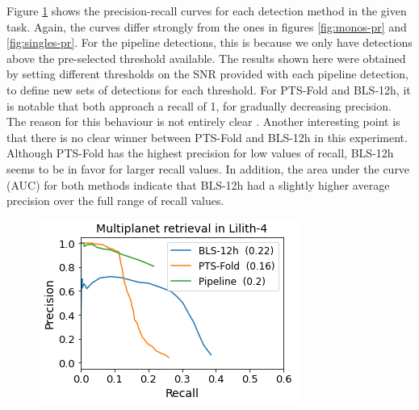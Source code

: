 Figure \ref{fig:multis-pr} shows the precision-recall curves for each detection method in the given task. Again, the curves differ strongly from the ones in figures \ref{fig:monos-pr} and \ref{fig:singles-pr}. For the pipeline detections, this is because we only have detections above the pre-selected threshold available. The results shown here were obtained by setting different thresholds on the SNR provided with each pipeline detection, to define new sets of detections for each threshold. For PTS-Fold and BLS-12h, it is notable that both approach a recall of 1, for gradually decreasing precision. The reason for this behaviour is not entirely clear . Another interesting point is that there is no clear winner between PTS-Fold and BLS-12h in this experiment. Although PTS-Fold has the highest precision for low values of recall, BLS-12h seems to be in favor for larger recall values. In addition, the area under the curve (AUC) for both methods indicate that BLS-12h had a slightly higher average precision over the full range of recall values.

\begin{figure}
    \centering
    \includegraphics[width=0.4\linewidth]{Experiments/Figures/Multis/multis_pr.png}
    \caption{ }
    \label{fig:multis-pr}
\end{figure}